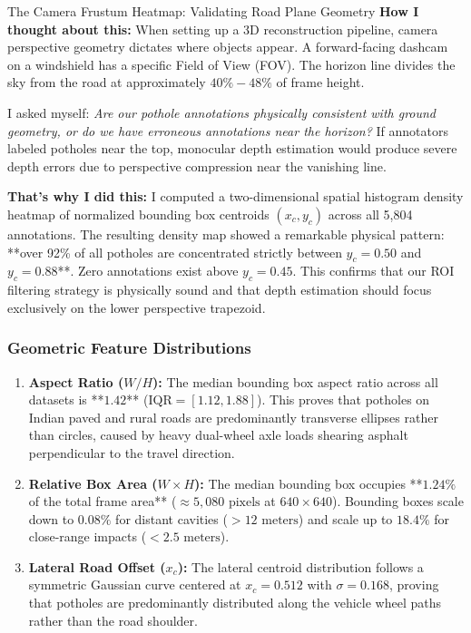 \begin{designreflection}{The Camera Frustum Heatmap: Validating Road Plane Geometry}
\textbf{How I thought about this:}
When setting up a 3D reconstruction pipeline, camera perspective geometry dictates where objects appear. A forward-facing dashcam on a windshield has a specific Field of View (FOV). The horizon line divides the sky from the road at approximately $40\% - 48\%$ of frame height.

I asked myself: \textit{Are our pothole annotations physically consistent with ground geometry, or do we have erroneous annotations near the horizon?} If annotators labeled potholes near the top, monocular depth estimation would produce severe depth errors due to perspective compression near the vanishing line.

\textbf{That's why I did this:}
I computed a two-dimensional spatial histogram density heatmap of normalized bounding box centroids $(x_c, y_c)$ across all 5,804 annotations. The resulting density map showed a remarkable physical pattern: **over 92\% of all potholes are concentrated strictly between $y_c = 0.50$ and $y_c = 0.88$**. Zero annotations exist above $y_c = 0.45$. This confirms that our ROI filtering strategy is physically sound and that depth estimation should focus exclusively on the lower perspective trapezoid.
\end{designreflection}

\subsubsection{Geometric Feature Distributions}
\begin{enumerate}
    \item \textbf{Aspect Ratio ($W / H$):} The median bounding box aspect ratio across all datasets is **$1.42$** ($\text{IQR} = [1.12, 1.88]$). This proves that potholes on Indian paved and rural roads are predominantly transverse ellipses rather than circles, caused by heavy dual-wheel axle loads shearing asphalt perpendicular to the travel direction.
    \item \textbf{Relative Box Area ($W \times H$):} The median bounding box occupies **$1.24\%$ of the total frame area** ($\approx 5,080\text{ pixels}$ at $640\times640$). Bounding boxes scale down to $0.08\%$ for distant cavities ($> 12\text{ meters}$) and scale up to $18.4\%$ for close-range impacts ($< 2.5\text{ meters}$).
    \item \textbf{Lateral Road Offset ($x_c$):} The lateral centroid distribution follows a symmetric Gaussian curve centered at $x_c = 0.512$ with $\sigma = 0.168$, proving that potholes are predominantly distributed along the vehicle wheel paths rather than the road shoulder.
\end{enumerate}

